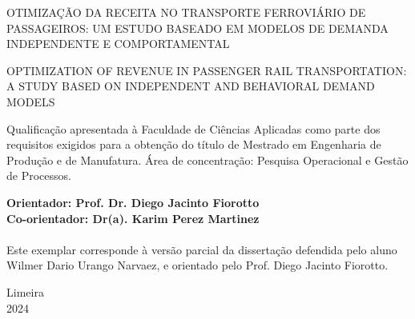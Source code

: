 \vspace*{1.0cm}

\begin{center}
	{\sc \Large OTIMIZAÇÃO DA RECEITA NO TRANSPORTE FERROVIÁRIO DE PASSAGEIROS: UM ESTUDO BASEADO EM MODELOS DE DEMANDA INDEPENDENTE E COMPORTAMENTAL}
	\vspace*{1cm}
\end{center}

\begin{center}
	{\sc \Large OPTIMIZATION OF REVENUE IN PASSENGER RAIL TRANSPORTATION: A STUDY BASED ON INDEPENDENT AND BEHAVIORAL DEMAND MODELS}
	\vspace*{1cm}
\end{center}



\begin{flushright}
	\begin{minipage}{9.0cm}
		Qualificação apresentada à Faculdade de Ciências Aplicadas como parte dos
		requisitos exigidos para a obtenção do título de Mestrado em Engenharia de Produção e de Manufatura. Área de
		concentração: Pesquisa Operacional e Gestão de Processos.
	\end{minipage}
\end{flushright}
\vspace*{0.5cm}

\begin{flushleft}
	\begin{minipage}[c]{.5\textwidth}
		\textbf{Orientador: Prof. Dr. Diego Jacinto Fiorotto}\\
		\textbf{Co-orientador: Dr(a). Karim Perez Martinez} \\ \vspace*{1cm} \\
		Este exemplar corresponde à versão parcial da dissertação defendida pelo aluno Wilmer Dario Urango Narvaez, e orientado pelo Prof. Diego Jacinto Fiorotto.
	\end{minipage}
\end{flushleft}
\vspace*{0.5cm}

\begin{center}
	Limeira\\2024
\end{center}


